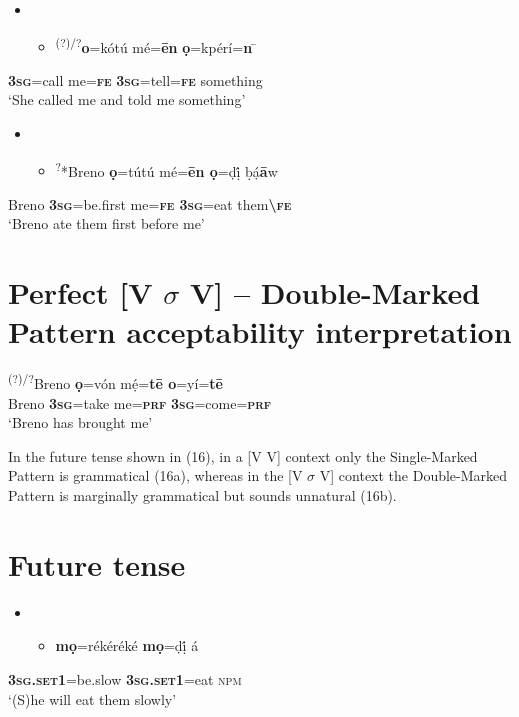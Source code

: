 \begin{itemize}
\item \setcounter{itemize}{0}
\begin{itemize}
\item \gll \textsuperscript{   (?)/?}\textbf{o}=kótú    mé=\textbf{\=en}   \textbf{ọ}=kpérí=\textbf{n}   \=\\
\end{itemize}
\end{itemize}
     \textbf{\textsc{    3sg}}=call    me=\textbf{\textsc{fe}}\textsc{   }\textbf{\textsc{3sg}}=tell=\textbf{\textsc{fe}}  something\\
\glt ‘She called me and told me something’
\z

\begin{itemize}
\item \setcounter{itemize}{0}
\begin{itemize}
\item \gll \textsuperscript{     ?}*Breno\textbf{   ọ}=tútú     mé=\textbf{\={e}n  ọ}=ḍị́   ḅạ́\textbf{\={a}}w\\
\end{itemize}
\end{itemize}
         Breno  \textbf{\textsc{3sg}}=be.first  me=\textbf{\textsc{fe   3sg}}=eat  them\textbf{{\textbackslash}}\textbf{\textsc{fe}}\\
\glt ‘Breno ate them first before me’
\z

\chapter[Perfect [V $\sigma $ V{]} – Double{}-Marked Pattern acceptability interpretation]{Perfect [V $\sigma $ V] – Double-Marked Pattern acceptability interpretation}
\label{bkm:Ref448215232}\gll \textsuperscript{ (?)/?}Breno   \textbf{ọ}=vón     mẹ́=\textbf{t\=e     o}=yí=\textbf{t\=e}\\
       Breno   \textbf{\textsc{3sg}}=take   me=\textbf{\textsc{prf}}\textbf{     }\textbf{\textsc{3sg}}=come=\textbf{\textsc{prf}}\\
\glt ‘Breno has brought me’ 
\z

In the future tense shown in (16), in a [V V] context only the Single-Marked Pattern is grammatical (16a), whereas in the [V $\sigma $ V] context the Double-Marked Pattern is marginally grammatical but sounds unnatural (16b). 

\chapter[Future tense]{Future tense}
\label{bkm:Ref453836287}\begin{itemize}
\item \setcounter{itemize}{0}
\begin{itemize}
\item \gll *\textbf{mọ}=rékéréké    \textbf{mọ}=ḍị́       á    \\
\end{itemize}
\end{itemize}
     \textbf{\textsc{3sg.set1}}=be.slow  \textbf{\textsc{3sg}}\textbf{.}\textbf{\textsc{set1}}=eat  \textsc{npm}\\
\glt ‘(S)he will eat them slowly’
\z

